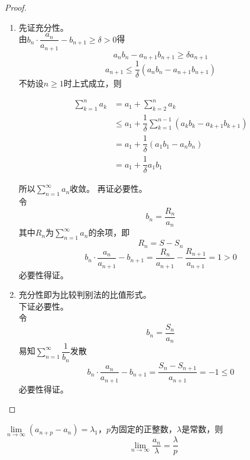 \begin{proof}
    
    \begin{enumerate}

        \item   
            先证充分性。\\
            由$b_n \cdot \dfrac{a_n}{a_{n + 1}} - b_{n + 1} \geq \delta > 0$得
            \[a_nb_n - a_{n + 1}b_{n + 1} \geq \delta a_{n + 1}\]
            \[a_{n + 1} \leq \dfrac{1}{\delta}(a_nb_n - a_{n + 1}b_{n + 1})\]
            不妨设$n \geq 1$时上式成立，则

            \begin{align*}
                \sum\limits_{k  = 1}^{n}{a_k} & = a_1 + \sum\limits_{k = 2}^{n}{a_k} \\
                & \leq a_1 + \dfrac{1}{\delta} \sum\limits_{k  = 1}^{n - 1}{(a_k b_k - a_{k + 1}b_{k + 1})} \\
                & = a_1 + \dfrac{1}{\delta}(a_1 b_1 - a_{n}b_{n}) \\
                & = a_1 + \dfrac{1}{\delta}a_1 b_1
            \end{align*}

            所以$\sum\limits_{n = 1}^{\infty}{a_n}$收敛。
            再证必要性。\\
            令
            \[b_n = \dfrac{R_n}{a_n}\]
            其中$R_n$为$\sum\limits_{n = 1}^{\infty}{a_n}$的余项，即
            \[R_n = S - S_n\]
            \[b_n \cdot \dfrac{a_n}{a_{n + 1}} - b_{n + 1} = \dfrac{R_n}{a_{n + 1}} - \dfrac{R_{n + 1}}{a_{n + 1}} = 1 > 0\]
            必要性得证。

        \item   
            充分性即为比较判别法的比值形式。\\
            下证必要性。\\
            令
            \[b_n = \dfrac{S_n}{a_n}\]
            易知$\sum\limits_{n = 1}^{\infty}{\dfrac{1}{b_n}}$发散
            \[b_n \cdot \dfrac{a_n}{a_{n + 1}} - b_{n + 1} = \dfrac{S_{n} - S_{n + 1}}{a_{n + 1}} = -1 \leq 0\]
            必要性得证。

\end{enumerate}

\end{proof}

\begin{proposition}
    
    $\lim\limits_{n \to \infty}{(a_{n + p} - a_n)} = \lambda_1$，$p$为固定的正整数，$\lambda$是常数，则
    \[\lim\limits_{n \to \infty}{\dfrac{a_n}{\lambda}} = \dfrac{\lambda}{p}\]

\end{proposition}

